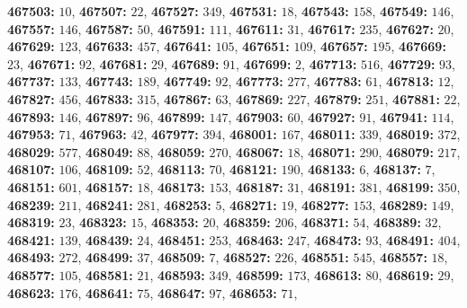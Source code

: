 \textsf{\bfseries 467503:} $10$, \textsf{\bfseries 467507:} $22$, \textsf{\bfseries 467527:} $349$, \textsf{\bfseries 467531:} $18$, \textsf{\bfseries 467543:} $158$, \textsf{\bfseries 467549:} $146$, \textsf{\bfseries 467557:} $146$, \textsf{\bfseries 467587:} $50$, \textsf{\bfseries 467591:} $111$, \textsf{\bfseries 467611:} $31$, \textsf{\bfseries 467617:} $235$, \textsf{\bfseries 467627:} $20$, \textsf{\bfseries 467629:} $123$, \textsf{\bfseries 467633:} $457$, \textsf{\bfseries 467641:} $105$, \textsf{\bfseries 467651:} $109$, \textsf{\bfseries 467657:} $195$, \textsf{\bfseries 467669:} $23$, \textsf{\bfseries 467671:} $92$, \textsf{\bfseries 467681:} $29$, \textsf{\bfseries 467689:} $91$, \textsf{\bfseries 467699:} $2$, \textsf{\bfseries 467713:} $516$, \textsf{\bfseries 467729:} $93$, \textsf{\bfseries 467737:} $133$, \textsf{\bfseries 467743:} $189$, \textsf{\bfseries 467749:} $92$, \textsf{\bfseries 467773:} $277$, \textsf{\bfseries 467783:} $61$, \textsf{\bfseries 467813:} $12$, \textsf{\bfseries 467827:} $456$, \textsf{\bfseries 467833:} $315$, \textsf{\bfseries 467867:} $63$, \textsf{\bfseries 467869:} $227$, \textsf{\bfseries 467879:} $251$, \textsf{\bfseries 467881:} $22$, \textsf{\bfseries 467893:} $146$, \textsf{\bfseries 467897:} $96$, \textsf{\bfseries 467899:} $147$, \textsf{\bfseries 467903:} $60$, \textsf{\bfseries 467927:} $91$, \textsf{\bfseries 467941:} $114$, \textsf{\bfseries 467953:} $71$, \textsf{\bfseries 467963:} $42$, \textsf{\bfseries 467977:} $394$, \textsf{\bfseries 468001:} $167$, \textsf{\bfseries 468011:} $339$, \textsf{\bfseries 468019:} $372$, \textsf{\bfseries 468029:} $577$, \textsf{\bfseries 468049:} $88$, \textsf{\bfseries 468059:} $270$, \textsf{\bfseries 468067:} $18$, \textsf{\bfseries 468071:} $290$, \textsf{\bfseries 468079:} $217$, \textsf{\bfseries 468107:} $106$, \textsf{\bfseries 468109:} $52$, \textsf{\bfseries 468113:} $70$, \textsf{\bfseries 468121:} $190$, \textsf{\bfseries 468133:} $6$, \textsf{\bfseries 468137:} $7$, \textsf{\bfseries 468151:} $601$, \textsf{\bfseries 468157:} $18$, \textsf{\bfseries 468173:} $153$, \textsf{\bfseries 468187:} $31$, \textsf{\bfseries 468191:} $381$, \textsf{\bfseries 468199:} $350$, \textsf{\bfseries 468239:} $211$, \textsf{\bfseries 468241:} $281$, \textsf{\bfseries 468253:} $5$, \textsf{\bfseries 468271:} $19$, \textsf{\bfseries 468277:} $153$, \textsf{\bfseries 468289:} $149$, \textsf{\bfseries 468319:} $23$, \textsf{\bfseries 468323:} $15$, \textsf{\bfseries 468353:} $20$, \textsf{\bfseries 468359:} $206$, \textsf{\bfseries 468371:} $54$, \textsf{\bfseries 468389:} $32$, \textsf{\bfseries 468421:} $139$, \textsf{\bfseries 468439:} $24$, \textsf{\bfseries 468451:} $253$, \textsf{\bfseries 468463:} $247$, \textsf{\bfseries 468473:} $93$, \textsf{\bfseries 468491:} $404$, \textsf{\bfseries 468493:} $272$, \textsf{\bfseries 468499:} $37$, \textsf{\bfseries 468509:} $7$, \textsf{\bfseries 468527:} $226$, \textsf{\bfseries 468551:} $545$, \textsf{\bfseries 468557:} $18$, \textsf{\bfseries 468577:} $105$, \textsf{\bfseries 468581:} $21$, \textsf{\bfseries 468593:} $349$, \textsf{\bfseries 468599:} $173$, \textsf{\bfseries 468613:} $80$, \textsf{\bfseries 468619:} $29$, \textsf{\bfseries 468623:} $176$, \textsf{\bfseries 468641:} $75$, \textsf{\bfseries 468647:} $97$, \textsf{\bfseries 468653:} $71$, 
